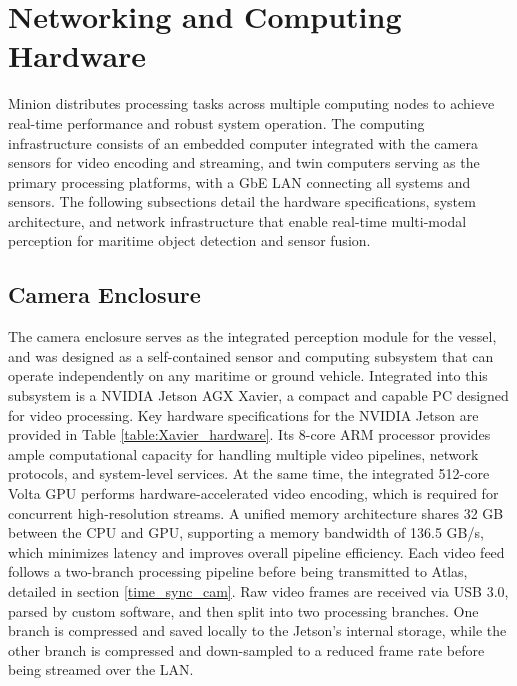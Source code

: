 \documentclass{erauthesis}
\begin{document}
\section{Networking and Computing Hardware} \label{sec:Atlas_LAN}
% 



Minion distributes processing tasks across multiple computing nodes to achieve real-time performance and robust system operation.
The computing infrastructure consists of an embedded computer integrated with the camera sensors for video encoding and streaming, and twin computers serving as the primary processing platforms, with a \ac{GbE} \ac{LAN} connecting all systems and sensors. 
The following subsections detail the hardware specifications, system architecture, and network infrastructure that enable real-time multi-modal perception for maritime object detection and sensor fusion.

\subsection{Camera Enclosure} \label{comp:camera_enclosure}


The camera enclosure serves as the integrated perception module for the vessel, and was designed as a self-contained sensor and computing subsystem that can operate independently on any maritime or ground vehicle. 
Integrated into this subsystem is a NVIDIA Jetson AGX Xavier, a compact and capable PC designed for video processing.
Key hardware specifications for the NVIDIA Jetson are provided in Table \ref{table:Xavier_hardware}.
Its 8-core ARM processor provides ample computational capacity for handling multiple video pipelines, network protocols, and system-level services. 
At the same time, the integrated 512-core Volta GPU performs hardware-accelerated video encoding, which is required for concurrent high-resolution streams.  
A unified memory architecture shares 32 GB between the CPU and GPU, supporting a memory bandwidth of 136.5 GB/s, which minimizes latency and improves overall pipeline efficiency.
Each video feed follows a two-branch processing pipeline before being transmitted to Atlas, detailed in section \ref{time_sync_cam}.
Raw video frames are received via USB 3.0, parsed by custom software, and then split into two processing branches. 
One branch is compressed and saved locally to the Jetson's internal storage, while the other branch is compressed and down-sampled to a reduced frame rate before being streamed over the \ac{LAN}.%
\end{document}
